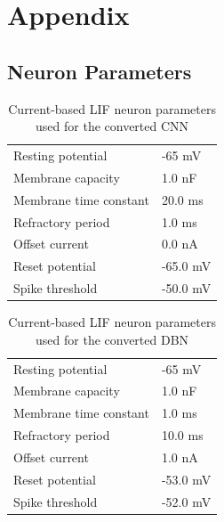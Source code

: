 \chapter{Appendix }

\section{Neuron Parameters}

\begin{table}[h!]
\caption{Current-based LIF neuron parameters used for the converted CNN}
\centering
\label{cnnlifparam}
\begin{tabularx}{0.65\textwidth}{|XX|}
\hline
Resting potential    		& -65 mV 		    \\
Membrane capacity    		& 1.0 nF 		     \\
Membrane time constant    	& 20.0 ms		             \\
Refractory period     		& 1.0 ms		                 \\
Offset current    			& 0.0 nA		              \\
Reset potential     		& -65.0 mV 	               \\
Spike threshold     		& -50.0 mV          \\\hline
\end{tabularx}
\end{table}

\begin{table}[h!]
\caption{Current-based LIF neuron parameters used for the converted DBN}
\centering
\label{cubalifparam}
\begin{tabularx}{0.65\textwidth}{|XX|}
\hline
Resting potential    		& -65 mV 		    \\
Membrane capacity    		& 1.0 nF 		     \\
Membrane time constant    	& 1.0 ms		             \\
Refractory period     		& 10.0 ms		                 \\
Offset current    			& 1.0 nA		              \\
Reset potential     		& -53.0 mV 	               \\
Spike threshold     		& -52.0 mV          \\\hline
\end{tabularx}
\end{table}


